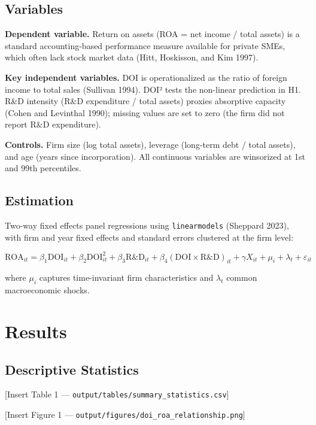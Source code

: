 \documentclass[
  11pt,
  letterpaper,
  DIV=11,
  numbers=noendperiod]{scrartcl}
\begin{document}
\subsection{Variables}\label{variables}

\textbf{Dependent variable.} Return on assets (ROA = net income / total
assets) is a standard accounting-based performance measure available for
private SMEs, which often lack stock market data (Hitt, Hoskisson, and
Kim 1997).

\textbf{Key independent variables.} DOI is operationalized as the ratio
of foreign income to total sales (Sullivan 1994). DOI² tests the
non-linear prediction in H1. R\&D intensity (R\&D expenditure / total
assets) proxies absorptive capacity (Cohen and Levinthal 1990); missing
values are set to zero (the firm did not report R\&D expenditure).

\textbf{Controls.} Firm size (log total assets), leverage (long-term
debt / total assets), and age (years since incorporation). All
continuous variables are winsorized at 1st and 99th percentiles.

\subsection{Estimation}\label{estimation}

Two-way fixed effects panel regressions using \texttt{linearmodels}
(Sheppard 2023), with firm and year fixed effects and standard errors
clustered at the firm level:

\[
\text{ROA}_{it} = \beta_1 \text{DOI}_{it} + \beta_2 \text{DOI}_{it}^2 + \beta_3 \text{R\&D}_{it} + \beta_4 (\text{DOI} \times \text{R\&D})_{it} + \gamma X_{it} + \mu_i + \lambda_t + \varepsilon_{it}
\]

where \(\mu_i\) captures time-invariant firm characteristics and
\(\lambda_t\) common macroeconomic shocks.

\section{Results}\label{results}

\subsection{Descriptive Statistics}\label{descriptive-statistics}

{[}Insert Table 1 --- \texttt{output/tables/summary\_statistics.csv}{]}

{[}Insert Figure 1 ---
\texttt{output/figures/doi\_roa\_relationship.png}{]}
\end{document}
